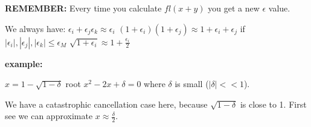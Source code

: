 \documentclass{article}
\newcommand{\n}{\newline}
\begin{document}
\begin{flushleft}
	 \textbf{REMEMBER:} Every time you calculate $fl(x+y)$ you get a new $\epsilon$ value.\n
	 
	 We always have:\n
	 $\epsilon_{i}+\epsilon_{j}\epsilon_{k}\approx\epsilon_{i}$ \n
	 $(1+\epsilon_{i})(1+\epsilon_{j})\approx1+\epsilon_{i}+\epsilon_{j}$ if $|\epsilon_{i}|,|\epsilon_{j}|,|\epsilon_{k}|\leq\epsilon_{M}$ \n
	 $\sqrt{1+\epsilon_{i}}\approx1+\frac{\epsilon_i}{2}$\n
	 
	 \textbf{example: } \n
	 
	 $x=1-\sqrt{1-\delta}$ root $x^{2}-2x+\delta=0$ where $\delta$ is small ($|\delta|<<1$).\n
	 
	 We have a catastrophic cancellation case here, because $\sqrt{1-\delta}$ is close to 1.  First see we can approximate $x\approx\frac{\delta}{2}$. 
	 
	 
	
	
	\end{flushleft}
	

	
	
	
	
	

	
\end{document}
